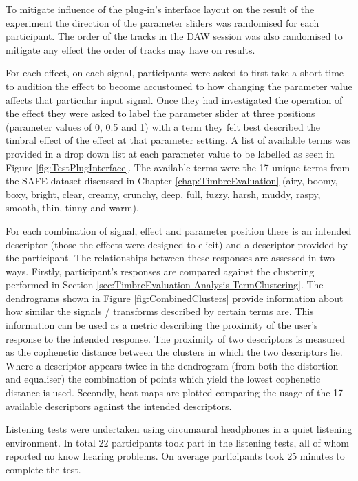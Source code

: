 			To mitigate influence of the plug-in's interface layout on the result of the experiment the
			direction of the parameter sliders was randomised for each participant. The order of the tracks in
			the DAW session was also randomised to mitigate any effect the order of tracks may have on results.

			For each effect, on each signal, participants were asked to first take a short time to audition the
			effect to become accustomed to how changing the parameter value affects that particular input
			signal. Once they had investigated the operation of the effect they were asked to label the
			parameter slider at three positions (parameter values of 0, 0.5 and 1) with a term they felt best
			described the timbral effect of the effect at that parameter setting. A list of available terms was
			provided in a drop down list at each parameter value to be labelled as seen in Figure
			\ref{fig:TestPlugInterface}. The available terms were the 17 unique terms from the SAFE dataset
			discussed in Chapter \ref{chap:TimbreEvaluation} (airy, boomy, boxy, bright, clear, creamy,
			crunchy, deep, full, fuzzy, harsh, muddy, raspy, smooth, thin, tinny and warm).

			For each combination of signal, effect and parameter position there is an intended descriptor
			(those the effects were designed to elicit) and a descriptor provided by the participant. The
			relationships between these responses are assessed in two ways. Firstly, participant's responses
			are compared against the clustering performed in Section
			\ref{sec:TimbreEvaluation-Analysis-TermClustering}. The dendrograms shown in Figure
			\ref{fig:CombinedClusters} provide information about how similar the signals / transforms described
			by certain terms are. This information can be used as a metric describing the proximity of the
			user's response to the intended response. The proximity of two descriptors is measured as the
			cophenetic distance between the clusters in which the two descriptors lie. Where a descriptor
			appears twice in the dendrogram (from both the distortion and equaliser) the combination of points
			which yield the lowest cophenetic distance is used. Secondly, heat maps are plotted comparing the
			usage of the 17 available descriptors against the intended descriptors.

			Listening tests were undertaken using circumaural headphones in a quiet listening environment. In
			total 22 participants took part in the listening tests, all of whom reported no know hearing
			problems. On average participants took 25 minutes to complete the test.

